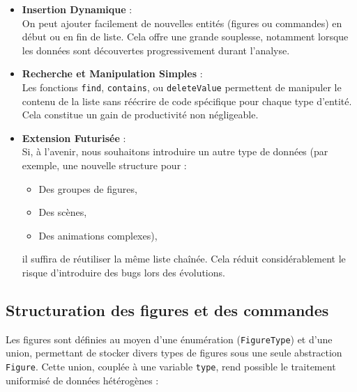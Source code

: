 \documentclass[12pt,a4paper]{article}
\begin{document}
\begin{itemize}
    \item \textbf{Insertion Dynamique} : \\
    On peut ajouter facilement de nouvelles entités (figures ou commandes) en début ou en fin de liste. Cela offre une grande souplesse, notamment lorsque les données sont découvertes progressivement durant l’analyse.

    \item \textbf{Recherche et Manipulation Simples} : \\
    Les fonctions \texttt{find}, \texttt{contains}, ou \texttt{deleteValue} permettent de manipuler le contenu de la liste sans réécrire de code spécifique pour chaque type d’entité. Cela constitue un gain de productivité non négligeable.

    \item \textbf{Extension Futurisée} : \\
    Si, à l’avenir, nous souhaitons introduire un autre type de données (par exemple, une nouvelle structure pour :
    \begin{itemize}
        \item Des groupes de figures,
        \item Des scènes,
        \item Des animations complexes),
    \end{itemize}
    il suffira de réutiliser la même liste chaînée. Cela réduit considérablement le risque d’introduire des bugs lors des évolutions.
\end{itemize}

\subsection{Structuration des figures et des commandes}
Les figures sont définies au moyen d’une énumération (\texttt{FigureType}) et d’une union, permettant de stocker divers types de figures sous une seule abstraction \texttt{Figure}. Cette union, couplée à une variable \texttt{type}, rend possible le traitement uniformisé de données hétérogènes :
\end{document}

